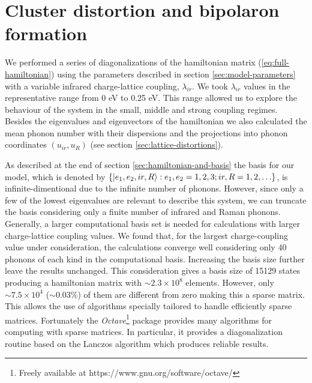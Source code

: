 \chapter{Cluster distortion and bipolaron formation}
\label{chap:ground}

We performed a series of diagonalizations of the hamiltonian matrix (\ref{eq:full-hamiltonian}) using the parameters described in section \ref{sec:model-parameters} with a variable infrared charge-lattice coupling, $\lambda_{ir}$. 
We took $\lambda_{ir}$ values in the representative range from 0 eV to 0.25 eV. 
This range allowed us to explore the behaviour of the system in the small, middle and strong coupling regimes. 
Besides the eigenvalues and eigenvectors of the hamiltonian we also calculated the mean phonon number with their dispersions and the projections into phonon coordinates $(u_{ir}, u_R)$ (see section \ref{sec:lattice-distortions}).

As described at the end of section \ref{sec:hamiltonian-and-basis} the basis for our model, which is denoted by $\{\left | e_1,e_2,ir,R \right\rangle: e_1,e_2=1,2,3; ir,R=1,2,\ldots\}$, is infinite-dimentional due to the infinite number of phonons.
However, since only a few of the lowest eigenvalues are relevant to describe this system, we can truncate the basis considering only a finite number of infrared and Raman phonons.
Generally, a larger computational basis set is needed for calculations with larger charge-lattice coupling values.
We found that, for the largest charge-coupling value under consideration, the calculations converge well considering only 40 phonons of each kind in the computational basis.
Increasing the basis size further leave the results unchanged.
This consideration gives a basis size of 15129 states producing a hamiltonian matrix with $\sim 2.3\times 10^{8}$ elements.
However, only $\sim 7.5 \times 10^{4}$ ($\sim 0.03 \%$) of them are different from zero making this a sparse matrix.
This allows the use of algorithms specially tailored to handle efficiently sparse matrices.
Fortunately the \textit{Octave}\footnote{Freely available at https://www.gnu.org/software/octave/} package provides many algorithms for computing with sparse matrices.
In particular, it provides a diagonalization routine based on the Lanczos algorithm which produces reliable results.

